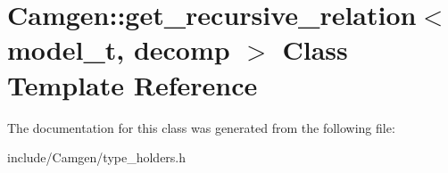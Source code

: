 \hypertarget{a00246}{\section{Camgen\-:\-:get\-\_\-recursive\-\_\-relation$<$ model\-\_\-t, decomp $>$ Class Template Reference}
\label{a00246}
}


The documentation for this class was generated from the following file\-:\begin{DoxyCompactItemize}
\item 
include/\-Camgen/type\-\_\-holders.\-h\end{DoxyCompactItemize}
